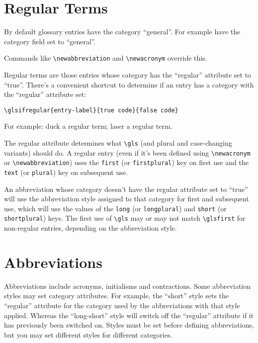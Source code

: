 \documentclass{report}
\begin{document}
\chapter{Regular Terms}

By default glossary entries have the category ``general''.
For
example have the category field set to ``general''.

Commands like \verb|\newabbreviation| and \verb|\newacronym| 
override this.

Regular terms are those entries whose category has the ``regular''
attribute set to ``true''. There's a convenient shortcut to
determine if an entry has a category with the ``regular'' attribute
set:
\begin{verbatim}
\glsifregular{entry-label}{true code}{false code}
\end{verbatim}

For example: \gls{duck}  a regular
term; 
\gls{laser}  a regular
term.

The regular attribute determines what \verb|\gls| (and plural and
case-changing variants) should do. A regular entry (even if
it's been defined using \verb|\newacronym| or
\verb|\newabbreviation|) uses the \texttt{first} (or
\texttt{firstplural}) key on first use and the \texttt{text}
(or \texttt{plural}) key on subsequent use.

An abbreviation whose category doesn't have the regular attribute
set to ``true'' will use the abbreviation style assigned
to that category for first and subsequent use, which will use
the values of the \texttt{long} (or \texttt{longplural})
and \texttt{short} (or \texttt{shortplural}) keys.
The first use of \verb|\gls| may or may not match \verb|\glsfirst|
for non-regular entries, depending on the abbreviation style.

\chapter{Abbreviations}

Abbreviations include acronyms, initialisms and contractions.
Some abbreviation styles may set category attributes.
For example, the ``short'' style sets the ``regular'' attribute for
the category used by the abbreviations with that style applied.
Whereas the ``long-short'' style will switch off the ``regular'' attribute
if it has previously been switched on.
Styles must be set before defining abbreviations, but you may set
different styles for different categories.
\end{document}
